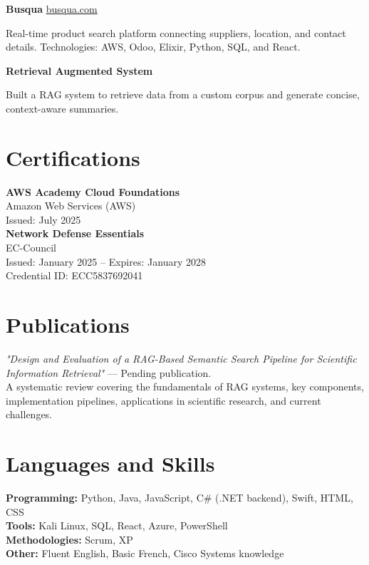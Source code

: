 \documentclass[11pt,a4paper]{article}
\newenvironment{uniformindent}{%
  \begin{list}{}{%
    \setlength{\leftmargin}{2em}
    \setlength{\rightmargin}{0pt}
    \setlength{\topsep}{0pt}
    \setlength{\partopsep}{0pt}
    \setlength{\parsep}{0pt}
    \setlength{\itemsep}{0pt}
  }
  \item[]
}{%
  \end{list}
}
\newenvironment{indentedpar}{%
  \begin{list}{}{%
    \setlength{\leftmargin}{2em}
    \setlength{\rightmargin}{0pt}
    \setlength{\itemsep}{0pt}
    \setlength{\parsep}{0pt}
    \setlength{\topsep}{0pt}
  }
  \item[]
}{%
  \end{list}
}
\begin{document}
\begin{uniformindent}
\textbf{Busqua} \hfill \href{https://busqua.com}{busqua.com}
\begin{indentedpar}
Real-time product search platform connecting suppliers, location, and contact details. Technologies: AWS, Odoo, Elixir, Python, SQL, and React.
\end{indentedpar}

\textbf{Retrieval Augmented System}
\begin{indentedpar}
Built a RAG system to retrieve data from a custom corpus and generate concise, context-aware summaries.
\end{indentedpar}

\section*{Certifications}

\textbf{AWS Academy Cloud Foundations}\\
Amazon Web Services (AWS) \\ Issued: July 2025\\

\textbf{Network Defense Essentials}\\
EC-Council \\ Issued: January 2025 -- Expires: January 2028\\
Credential ID: ECC5837692041

\section*{Publications}

\textit{"Design and Evaluation of a RAG-Based Semantic Search Pipeline for Scientific Information Retrieval"} — Pending publication.\\
A systematic review covering the fundamentals of RAG systems, key components, implementation pipelines, applications in scientific research, and current challenges.

\section*{Languages and Skills}

\textbf{Programming:} Python, Java, JavaScript, C\# (.NET backend), Swift, HTML, CSS\\
\textbf{Tools:} Kali Linux, SQL, React, Azure, PowerShell\\
\textbf{Methodologies:} Scrum, XP\\
\textbf{Other:} Fluent English, Basic French, Cisco Systems knowledge

\end{uniformindent}
\end{document}
